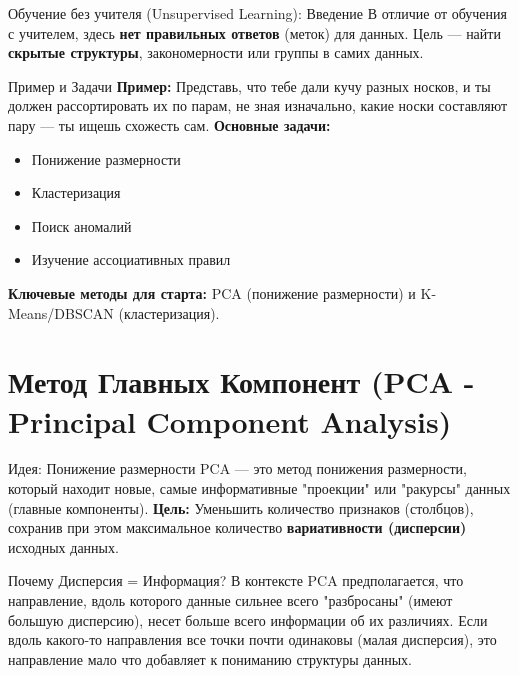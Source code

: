 
\begin{textbox}{Обучение без учителя (Unsupervised Learning): Введение}
    В отличие от обучения с учителем, здесь \textbf{нет правильных ответов} (меток) для данных. Цель — найти \textbf{скрытые структуры}, закономерности или группы в самих данных.
\end{textbox}

\begin{myexampleblock}{Пример и Задачи}
    \textbf{Пример:} Представь, что тебе дали кучу разных носков, и ты должен рассортировать их по парам, не зная изначально, какие носки составляют пару — ты ищешь схожесть сам.
    \vspace{0.5ex} %
    \textbf{Основные задачи:}
    \begin{itemize}[nosep, leftmargin=*]
        \item Понижение размерности
        \item Кластеризация
        \item Поиск аномалий
        \item Изучение ассоциативных правил
    \end{itemize}
    \textbf{Ключевые методы для старта:} PCA (понижение размерности) и K-Means/DBSCAN (кластеризация).
\end{myexampleblock}

\section{Метод Главных Компонент (PCA - Principal Component Analysis)}

\begin{myblock}{Идея: Понижение размерности}
    PCA — это метод понижения размерности, который находит новые, самые информативные "проекции" или "ракурсы" данных (главные компоненты).
    \vspace{0.5ex}
    \textbf{Цель:} Уменьшить количество признаков (столбцов), сохранив при этом максимальное количество \textbf{вариативности (дисперсии)} исходных данных.
\end{myblock}

\begin{textbox}{Почему Дисперсия = Информация?}
    В контексте PCA предполагается, что направление, вдоль которого данные сильнее всего "разбросаны" (имеют большую дисперсию), несет больше всего информации об их различиях. Если вдоль какого-то направления все точки почти одинаковы (малая дисперсия), это направление мало что добавляет к пониманию структуры данных.
\end{textbox}

